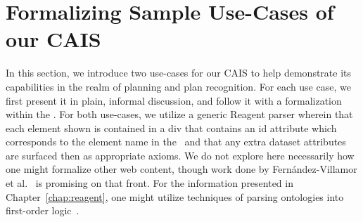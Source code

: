 \section{Formalizing Sample Use-Cases of our CAIS}\label{chap:use_cases}

In this section, we introduce two use-cases for our CAIS to help demonstrate
its capabilities in the realm of planning and plan recognition. For each
use case, we first present it in plain, informal discussion, and follow it
with a formalization within the \CEC. For both use-cases, we utilize a generic
Reagent parser wherein that each element shown is contained in a div that
contains an id attribute which corresponds to the element name in the \CEC\
and that any extra dataset attributes are surfaced then as appropriate axioms.
We do not explore here necessarily how one might formalize other web content,
though work done by Fern{\'a}ndez-Villamor et 
al.~\cite{fernandez-villamor_firstorder_2012} is promising on that front. For
the information presented in Chapter~\ref{chap:reagent}, one might utilize
techniques of parsing ontologies into first-order logic~\cite{pease_english_2003}.




